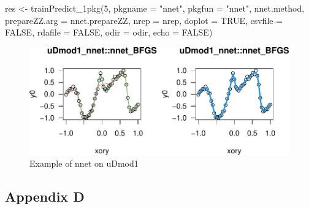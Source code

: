 \begin{Schunk}
\begin{Sinput}
res <- trainPredict_1pkg(5, pkgname = "nnet", pkgfun = "nnet", nnet.method,
  prepareZZ.arg = nnet.prepareZZ, nrep = nrep, doplot = TRUE,
  csvfile = FALSE, rdafile = FALSE, odir = odir, echo = FALSE)
\end{Sinput}
\begin{figure}

{\centering \includegraphics{gsoc1920-MVKDN-rev1_files/figure-latex/unnamed-chunk-8-1} 

}

\caption[Example of nnet on uDmod1]{Example of nnet on uDmod1}\label{fig:unnamed-chunk-8}
\end{figure}
\end{Schunk}

\hypertarget{appendix-d}{%
\subsection{Appendix D}\label{appendix-d}}

